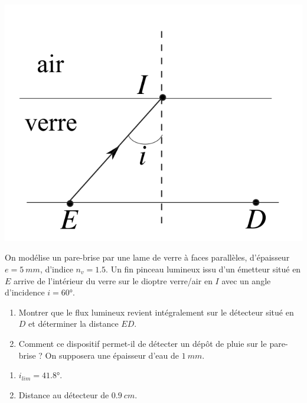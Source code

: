 \begin{minipage}[c]{\linewidth/2}
	\includegraphics[width=\linewidth]{Images/mpsi_s04_ex03.png}
\end{minipage}%
\begin{minipage}[c]{\linewidth/2}
	On modélise un pare-brise par une lame de verre à faces parallèles, d'épaisseur $e = \SI{5}{mm}$, d'indice $n_v = 1.5$. Un fin pinceau lumineux issu d'un émetteur situé en $E$ arrive de l'intérieur du verre sur le dioptre verre/air en $I$ avec un angle d'incidence $i=60$°.
\end{minipage}

\begin{enumerate}
	\item Montrer que le flux lumineux revient intégralement sur le détecteur situé en $D$ et déterminer la distance $ED$.
	\item Comment ce dispositif permet-il de détecter un dépôt de pluie sur le pare-brise ? On supposera une épaisseur d'eau de $\SI{1}{mm}$.
\end{enumerate}

\begin{enumerate}
	\item $i_{lim} = 41.8$°.
	\item Distance au détecteur de $\SI{0.9}{cm}$.
\end{enumerate}

